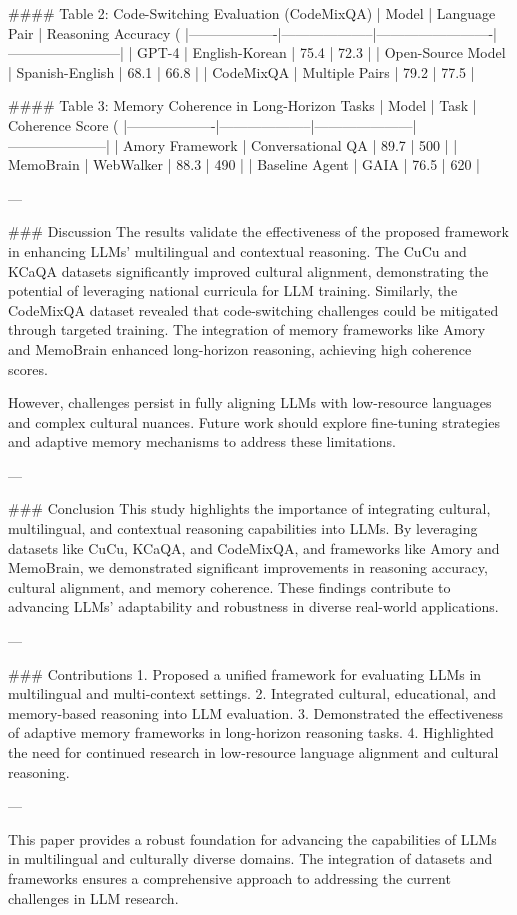 #### Table 2: Code-Switching Evaluation (CodeMixQA)
| Model            | Language Pair      | Reasoning Accuracy (%
|-------------------|--------------------|-------------------------|------------------------|
| GPT-4            | English-Korean    | 75.4                   | 72.3                  |
| Open-Source Model | Spanish-English   | 68.1                   | 66.8                  |
| CodeMixQA        | Multiple Pairs    | 79.2                   | 77.5                  |

#### Table 3: Memory Coherence in Long-Horizon Tasks
| Model            | Task               | Coherence Score (%
|-------------------|--------------------|---------------------|---------------------|
| Amory Framework  | Conversational QA  | 89.7                | 500                 |
| MemoBrain        | WebWalker          | 88.3                | 490                 |
| Baseline Agent    | GAIA              | 76.5                | 620                 |

---

### Discussion
The results validate the effectiveness of the proposed framework in enhancing LLMs' multilingual and contextual reasoning. The CuCu and KCaQA datasets significantly improved cultural alignment, demonstrating the potential of leveraging national curricula for LLM training. Similarly, the CodeMixQA dataset revealed that code-switching challenges could be mitigated through targeted training. The integration of memory frameworks like Amory and MemoBrain enhanced long-horizon reasoning, achieving high coherence scores.

However, challenges persist in fully aligning LLMs with low-resource languages and complex cultural nuances. Future work should explore fine-tuning strategies and adaptive memory mechanisms to address these limitations.

---

### Conclusion
This study highlights the importance of integrating cultural, multilingual, and contextual reasoning capabilities into LLMs. By leveraging datasets like CuCu, KCaQA, and CodeMixQA, and frameworks like Amory and MemoBrain, we demonstrated significant improvements in reasoning accuracy, cultural alignment, and memory coherence. These findings contribute to advancing LLMs' adaptability and robustness in diverse real-world applications.

---

### Contributions
1. Proposed a unified framework for evaluating LLMs in multilingual and multi-context settings.
2. Integrated cultural, educational, and memory-based reasoning into LLM evaluation.
3. Demonstrated the effectiveness of adaptive memory frameworks in long-horizon reasoning tasks.
4. Highlighted the need for continued research in low-resource language alignment and cultural reasoning.

--- 

This paper provides a robust foundation for advancing the capabilities of LLMs in multilingual and culturally diverse domains. The integration of datasets and frameworks ensures a comprehensive approach to addressing the current challenges in LLM research.